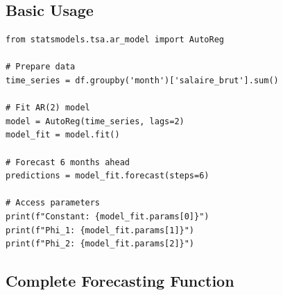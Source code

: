 \subsection{Basic Usage}

\begin{lstlisting}[style=pythonstyle]
from statsmodels.tsa.ar_model import AutoReg

# Prepare data
time_series = df.groupby('month')['salaire_brut'].sum()

# Fit AR(2) model
model = AutoReg(time_series, lags=2)
model_fit = model.fit()

# Forecast 6 months ahead
predictions = model_fit.forecast(steps=6)

# Access parameters
print(f"Constant: {model_fit.params[0]}")
print(f"Phi_1: {model_fit.params[1]}")
print(f"Phi_2: {model_fit.params[2]}")
\end{lstlisting}

\subsection{Complete Forecasting Function}

